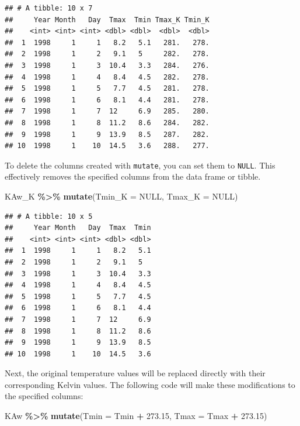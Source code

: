 \documentclass[
]{article}
\newenvironment{Shaded}{\begin{snugshade}}{\end{snugshade}}
\newcommand{\AttributeTok}[1]{\textcolor[rgb]{0.13,0.29,0.53}{#1}}
\newcommand{\ConstantTok}[1]{\textcolor[rgb]{0.56,0.35,0.01}{#1}}
\newcommand{\FloatTok}[1]{\textcolor[rgb]{0.00,0.00,0.81}{#1}}
\newcommand{\FunctionTok}[1]{\textcolor[rgb]{0.13,0.29,0.53}{\textbf{#1}}}
\newcommand{\NormalTok}[1]{#1}
\newcommand{\SpecialCharTok}[1]{\textcolor[rgb]{0.81,0.36,0.00}{\textbf{#1}}}
\begin{document}
\begin{verbatim}
## # A tibble: 10 x 7
##     Year Month   Day  Tmax  Tmin Tmax_K Tmin_K
##    <int> <int> <int> <dbl> <dbl>  <dbl>  <dbl>
##  1  1998     1     1   8.2   5.1   281.   278.
##  2  1998     1     2   9.1   5     282.   278.
##  3  1998     1     3  10.4   3.3   284.   276.
##  4  1998     1     4   8.4   4.5   282.   278.
##  5  1998     1     5   7.7   4.5   281.   278.
##  6  1998     1     6   8.1   4.4   281.   278.
##  7  1998     1     7  12     6.9   285.   280.
##  8  1998     1     8  11.2   8.6   284.   282.
##  9  1998     1     9  13.9   8.5   287.   282.
## 10  1998     1    10  14.5   3.6   288.   277.
\end{verbatim}

To delete the columns created with \texttt{mutate}, you can set them to \texttt{NULL}. This effectively removes the specified columns from the data frame or tibble.

\begin{Shaded}
\begin{Highlighting}[]
\NormalTok{KAw\_K }\SpecialCharTok{\%\textgreater{}\%} \FunctionTok{mutate}\NormalTok{(}\AttributeTok{Tmin\_K =} \ConstantTok{NULL}\NormalTok{, }\AttributeTok{Tmax\_K =} \ConstantTok{NULL}\NormalTok{)}
\end{Highlighting}
\end{Shaded}

\begin{verbatim}
## # A tibble: 10 x 5
##     Year Month   Day  Tmax  Tmin
##    <int> <int> <int> <dbl> <dbl>
##  1  1998     1     1   8.2   5.1
##  2  1998     1     2   9.1   5  
##  3  1998     1     3  10.4   3.3
##  4  1998     1     4   8.4   4.5
##  5  1998     1     5   7.7   4.5
##  6  1998     1     6   8.1   4.4
##  7  1998     1     7  12     6.9
##  8  1998     1     8  11.2   8.6
##  9  1998     1     9  13.9   8.5
## 10  1998     1    10  14.5   3.6
\end{verbatim}

Next, the original temperature values will be replaced directly with their corresponding Kelvin values. The following code will make these modifications to the specified columns:

\begin{Shaded}
\begin{Highlighting}[]
\NormalTok{KAw }\SpecialCharTok{\%\textgreater{}\%} \FunctionTok{mutate}\NormalTok{(}\AttributeTok{Tmin =}\NormalTok{ Tmin }\SpecialCharTok{+} \FloatTok{273.15}\NormalTok{, }\AttributeTok{Tmax =}\NormalTok{ Tmax }\SpecialCharTok{+} \FloatTok{273.15}\NormalTok{)}
\end{Highlighting}
\end{Shaded}
\end{document}

